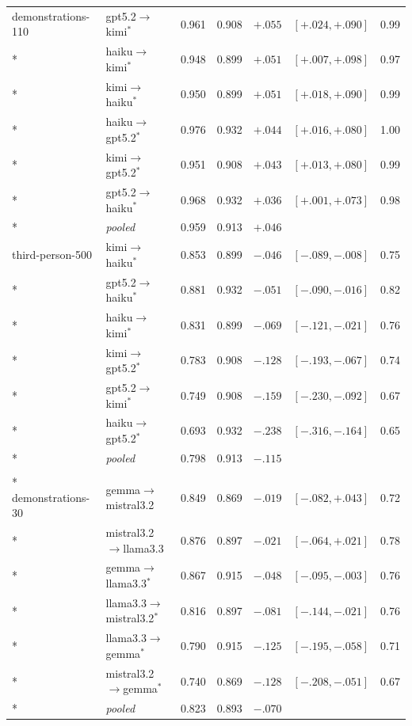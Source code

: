 {\begin{longtable}{llrlrrr}
demonstrations-110 & gpt5.2$\to$kimi$^{*}$ & 0.961 & 0.908 & $+.055$ & $[+.024,+.090]$ & 0.99 \\*
 & haiku$\to$kimi$^{*}$ & 0.948 & 0.899 & $+.051$ & $[+.007,+.098]$ & 0.97 \\*
 & kimi$\to$haiku$^{*}$ & 0.950 & 0.899 & $+.051$ & $[+.018,+.090]$ & 0.99 \\*
 & haiku$\to$gpt5.2$^{*}$ & 0.976 & 0.932 & $+.044$ & $[+.016,+.080]$ & 1.00 \\*
 & kimi$\to$gpt5.2$^{*}$ & 0.951 & 0.908 & $+.043$ & $[+.013,+.080]$ & 0.99 \\*
 & gpt5.2$\to$haiku$^{*}$ & 0.968 & 0.932 & $+.036$ & $[+.001,+.073]$ & 0.98 \\*
 & \emph{pooled} & 0.959 & 0.913 & $+.046$ & & \\
\addlinespace
third-person-500 & kimi$\to$haiku$^{*}$ & 0.853 & 0.899 & $-.046$ & $[-.089,-.008]$ & 0.75 \\*
 & gpt5.2$\to$haiku$^{*}$ & 0.881 & 0.932 & $-.051$ & $[-.090,-.016]$ & 0.82 \\*
 & haiku$\to$kimi$^{*}$ & 0.831 & 0.899 & $-.069$ & $[-.121,-.021]$ & 0.76 \\*
 & kimi$\to$gpt5.2$^{*}$ & 0.783 & 0.908 & $-.128$ & $[-.193,-.067]$ & 0.74 \\*
 & gpt5.2$\to$kimi$^{*}$ & 0.749 & 0.908 & $-.159$ & $[-.230,-.092]$ & 0.67 \\*
 & haiku$\to$gpt5.2$^{*}$ & 0.693 & 0.932 & $-.238$ & $[-.316,-.164]$ & 0.65 \\*
 & \emph{pooled} & 0.798 & 0.913 & $-.115$ & & \\
\addlinespace
\multicolumn{7}{l}{\emph{Local trio (preregistered)}} \\*
demonstrations-30 & gemma$\to$mistral3.2 & 0.849 & 0.869 & $-.019$ & $[-.082,+.043]$ & 0.72 \\*
 & mistral3.2$\to$llama3.3 & 0.876 & 0.897 & $-.021$ & $[-.064,+.021]$ & 0.78 \\*
 & gemma$\to$llama3.3$^{*}$ & 0.867 & 0.915 & $-.048$ & $[-.095,-.003]$ & 0.76 \\*
 & llama3.3$\to$mistral3.2$^{*}$ & 0.816 & 0.897 & $-.081$ & $[-.144,-.021]$ & 0.76 \\*
 & llama3.3$\to$gemma$^{*}$ & 0.790 & 0.915 & $-.125$ & $[-.195,-.058]$ & 0.71 \\*
 & mistral3.2$\to$gemma$^{*}$ & 0.740 & 0.869 & $-.128$ & $[-.208,-.051]$ & 0.67 \\*
 & \emph{pooled} & 0.823 & 0.893 & $-.070$ & & \\

\end{longtable}}
